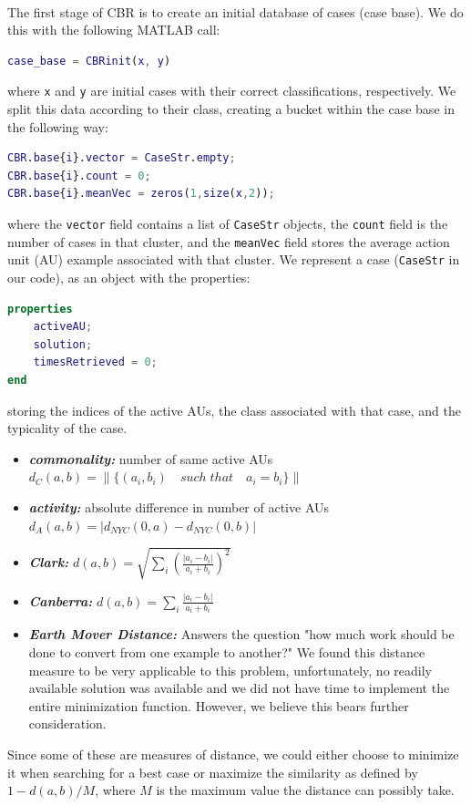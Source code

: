 \documentclass[a4paper,12pt,oneside,final]{report}
\newenvironment{changemargin}[2]{\begin{list}{}{%
\setlength{\topsep}{0pt}%
\setlength{\leftmargin}{0pt}%
\setlength{\rightmargin}{0pt}%
\setlength{\listparindent}{\parindent}%
\setlength{\itemindent}{\parindent}%
\setlength{\parsep}{0pt plus 1pt}%
\addtolength{\leftmargin}{#1}%
\addtolength{\rightmargin}{#2}%
}\item }{\end{list}}
\begin{document}
\paragraph{}
The first stage of CBR is to create an initial database of cases (case base).  We do this with the following MATLAB call:
\begin{changemargin}{-5mm}{-5mm}
\begin{lstlisting}[language=Matlab, frame=single]
case_base = CBRinit(x, y)
\end{lstlisting}
\end{changemargin}
where \verb+x+ and \verb+y+ are initial cases with their correct classifications, respectively.  We split this data according to their class, creating a bucket within the case base in the following way:
\begin{changemargin}{-5mm}{-5mm}
\begin{lstlisting}[language=Matlab, frame=single]
CBR.base{i}.vector = CaseStr.empty;
CBR.base{i}.count = 0;
CBR.base{i}.meanVec = zeros(1,size(x,2));
\end{lstlisting}
\end{changemargin}
where the \verb+vector+ field contains a list of \verb+CaseStr+ objects, the \verb+count+ field is the number of cases in that cluster, and the \verb+meanVec+ field stores the average action unit (AU) example associated with that cluster.  
We represent a case (\verb+CaseStr+ in our code), as an object with the properties:
\begin{changemargin}{-5mm}{-5mm}
\begin{lstlisting}[language=Matlab, frame=single]
properties
    activeAU;
    solution;
    timesRetrieved = 0;
end
\end{lstlisting}
\end{changemargin}
storing the indices of the active AUs, the class associated with that case, and the typicality of the case.
\begin{itemize}
\item {\bf\textit{commonality:}} number of same active AUs $d_C(a, b) = \|\{(a_i, b_i) \quad such\; that \quad a_i = b_i\}\|$
\item {\bf\textit{activity:}} absolute difference in number of active AUs $d_A(a,b) = |d_{NYC}(0, a) - d_{NYC}(0, b)|$
\item {\bf\textit{Clark:}} $d(a, b) = \sqrt{\sum_i \left( \frac{|a_i - b_i|}{a_i + b_i} \right)^2}$
\item {\bf\textit{Canberra:}} $d(a, b) = \sum_i \frac{|a_i - b_i|}{a_i + b_i}$
\item {\bf\textit{Earth Mover Distance:}} Answers the question "how much work should be done to convert from one example to another?"  We found this distance measure to be very applicable to this problem, unfortunately, no readily available solution was available and we did not have time to implement the entire minimization function.  However, we believe this bears further consideration.
\end{itemize}
Since some of these are measures of distance, we could either choose to minimize it when searching for a best case or maximize the similarity as defined by $1 - {d(a,b)}/M$, where $M$ is the maximum value the distance can possibly take.
\end{document}
